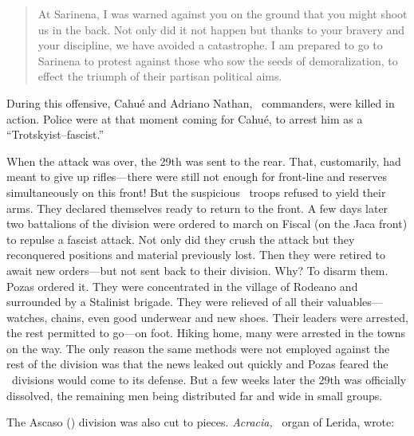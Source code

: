\begin{quotation}
  At Sarinena, I was warned against you on the ground that you might shoot us in the back. Not only did it not happen but thanks to your bravery and your discipline, we have avoided a catastrophe. I am prepared to go to Sarinena to protest against those who sow the seeds of demoralization, to effect the triumph of their partisan political aims.
\end{quotation}

\indexPOUM{}
During this offensive, Cahué and Adriano Nathan, \POUM\ commanders, were killed in action. Police were at that moment coming for Cahué, to arrest him as a ``Trotskyist--fascist.''

\indexSPozas{}\indexPOUM{}
When the attack was over, the 29th was sent to the rear. That, customarily, had meant to give up rifles---there were still not enough for front-line and reserves simultaneously on this front! But the suspicious \POUM\ troops refused to yield their arms. They declared themselves ready to return to the front. A few days later two battalions of the division were ordered to march on Fiscal (on the Jaca front) to repulse a fascist attack. Not only did they crush the attack but they reconquered positions and material previously lost. Then they were retired to await new orders---but not sent back to their division. Why? To disarm them. Pozas ordered it. They were concentrated in the village of Rodeano and surrounded by a Stalinist brigade. They were relieved of all their valuables---watches, chains, even good underwear and new shoes. Their leaders were arrested, the rest permitted to go---on foot. Hiking home, many were arrested in the towns on the way. The only reason the same methods were not employed against the rest of the division was that the news leaked out quickly and Pozas feared the \CNT\ divisions would come to its defense. But a few weeks later the 29th was officially dissolved, the remaining men being distributed far and wide in small groups.

\indexCNT
The Ascaso (\CNT) division was also cut to pieces. \emph{Acracia,} \CNT\ organ of Lerida, wrote:

